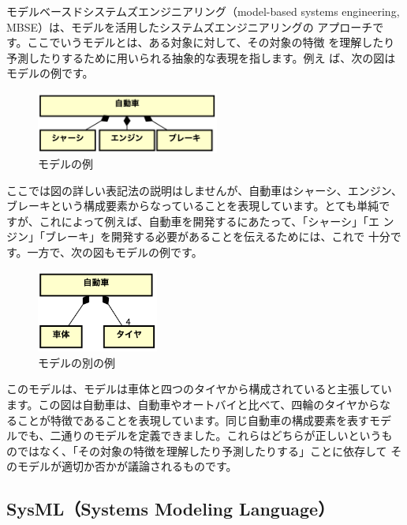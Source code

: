モデルベースドシステムズエンジニアリング（model-based systems
  engineering, MBSE）は、モデルを活用したシステムズエンジニアリングの
アプローチです。ここでいうモデルとは、ある対象に対して、その対象の特徴
を理解したり予測したりするために用いられる抽象的な表現を指します。例え
ば、次の図はモデルの例です。
\begin{figure}
    \begin{center}
    \includegraphics[width=60mm]{safety_assurance_contents/ch4images/fig4.png}
    \caption{モデルの例}
    \label{figure:ch4-4}
    \end{center}
\end{figure}
ここでは図の詳しい表記法の説明はしませんが、自動車はシャーシ、エンジン、
ブレーキという構成要素からなっていることを表現しています。とても単純で
すが、これによって例えば、自動車を開発するにあたって、「シャーシ」「エ
  ンジン」「ブレーキ」を開発する必要があることを伝えるためには、これで
十分です。一方で、次の図もモデルの例です。
\begin{figure}
    \begin{center}
    \includegraphics[width=40mm]{safety_assurance_contents/ch4images/fig5.png}
    \caption{モデルの別の例}
    \label{figure:ch4-5}
    \end{center}
\end{figure}
このモデルは、モデルは車体と四つのタイヤから構成されていると主張してい
ます。この図は自動車は、自動車やオートバイと比べて、四輪のタイヤからな
ることが特徴であることを表現しています。同じ自動車の構成要素を表すモデ
ルでも、二通りのモデルを定義できました。これらはどちらが正しいというも
のではなく、「その対象の特徴を理解したり予測したりする」ことに依存して
そのモデルが適切か否かが議論されるものです。

\subsection{SysML（Systems Modeling Language）}

